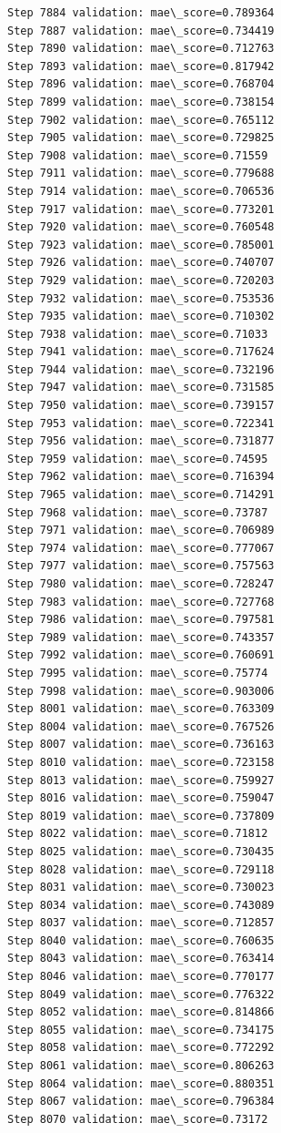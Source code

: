 \documentclass[11pt]{article}
\begin{document}
\begin{Verbatim}[commandchars=\\\{\}]
Step 7884 validation: mae\_score=0.789364
Step 7887 validation: mae\_score=0.734419
Step 7890 validation: mae\_score=0.712763
Step 7893 validation: mae\_score=0.817942
Step 7896 validation: mae\_score=0.768704
Step 7899 validation: mae\_score=0.738154
Step 7902 validation: mae\_score=0.765112
Step 7905 validation: mae\_score=0.729825
Step 7908 validation: mae\_score=0.71559
Step 7911 validation: mae\_score=0.779688
Step 7914 validation: mae\_score=0.706536
Step 7917 validation: mae\_score=0.773201
Step 7920 validation: mae\_score=0.760548
Step 7923 validation: mae\_score=0.785001
Step 7926 validation: mae\_score=0.740707
Step 7929 validation: mae\_score=0.720203
Step 7932 validation: mae\_score=0.753536
Step 7935 validation: mae\_score=0.710302
Step 7938 validation: mae\_score=0.71033
Step 7941 validation: mae\_score=0.717624
Step 7944 validation: mae\_score=0.732196
Step 7947 validation: mae\_score=0.731585
Step 7950 validation: mae\_score=0.739157
Step 7953 validation: mae\_score=0.722341
Step 7956 validation: mae\_score=0.731877
Step 7959 validation: mae\_score=0.74595
Step 7962 validation: mae\_score=0.716394
Step 7965 validation: mae\_score=0.714291
Step 7968 validation: mae\_score=0.73787
Step 7971 validation: mae\_score=0.706989
Step 7974 validation: mae\_score=0.777067
Step 7977 validation: mae\_score=0.757563
Step 7980 validation: mae\_score=0.728247
Step 7983 validation: mae\_score=0.727768
Step 7986 validation: mae\_score=0.797581
Step 7989 validation: mae\_score=0.743357
Step 7992 validation: mae\_score=0.760691
Step 7995 validation: mae\_score=0.75774
Step 7998 validation: mae\_score=0.903006
Step 8001 validation: mae\_score=0.763309
Step 8004 validation: mae\_score=0.767526
Step 8007 validation: mae\_score=0.736163
Step 8010 validation: mae\_score=0.723158
Step 8013 validation: mae\_score=0.759927
Step 8016 validation: mae\_score=0.759047
Step 8019 validation: mae\_score=0.737809
Step 8022 validation: mae\_score=0.71812
Step 8025 validation: mae\_score=0.730435
Step 8028 validation: mae\_score=0.729118
Step 8031 validation: mae\_score=0.730023
Step 8034 validation: mae\_score=0.743089
Step 8037 validation: mae\_score=0.712857
Step 8040 validation: mae\_score=0.760635
Step 8043 validation: mae\_score=0.763414
Step 8046 validation: mae\_score=0.770177
Step 8049 validation: mae\_score=0.776322
Step 8052 validation: mae\_score=0.814866
Step 8055 validation: mae\_score=0.734175
Step 8058 validation: mae\_score=0.772292
Step 8061 validation: mae\_score=0.806263
Step 8064 validation: mae\_score=0.880351
Step 8067 validation: mae\_score=0.796384
Step 8070 validation: mae\_score=0.73172

\end{Verbatim}
\end{document}
